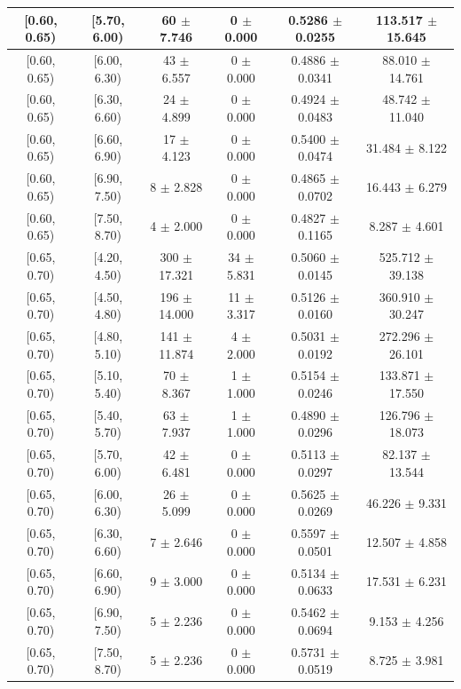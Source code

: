 \begin{longtable}{|c|c|c|c|c|c|}
\hline
[0.60, 0.65) & [5.70, 6.00) & 60 $\pm$ 7.746 & 0 $\pm$ 0.000 & 0.5286 $\pm$ 0.0255 & 113.517 $\pm$ 15.645 \\ 
\hline
[0.60, 0.65) & [6.00, 6.30) & 43 $\pm$ 6.557 & 0 $\pm$ 0.000 & 0.4886 $\pm$ 0.0341 & 88.010 $\pm$ 14.761 \\ 
\hline
[0.60, 0.65) & [6.30, 6.60) & 24 $\pm$ 4.899 & 0 $\pm$ 0.000 & 0.4924 $\pm$ 0.0483 & 48.742 $\pm$ 11.040 \\ 
\hline
[0.60, 0.65) & [6.60, 6.90) & 17 $\pm$ 4.123 & 0 $\pm$ 0.000 & 0.5400 $\pm$ 0.0474 & 31.484 $\pm$ 8.122 \\ 
\hline
[0.60, 0.65) & [6.90, 7.50) & 8 $\pm$ 2.828 & 0 $\pm$ 0.000 & 0.4865 $\pm$ 0.0702 & 16.443 $\pm$ 6.279 \\ 
\hline
[0.60, 0.65) & [7.50, 8.70) & 4 $\pm$ 2.000 & 0 $\pm$ 0.000 & 0.4827 $\pm$ 0.1165 & 8.287 $\pm$ 4.601 \\ 
\hline
[0.65, 0.70) & [4.20, 4.50) & 300 $\pm$ 17.321 & 34 $\pm$ 5.831 & 0.5060 $\pm$ 0.0145 & 525.712 $\pm$ 39.138 \\ 
\hline
[0.65, 0.70) & [4.50, 4.80) & 196 $\pm$ 14.000 & 11 $\pm$ 3.317 & 0.5126 $\pm$ 0.0160 & 360.910 $\pm$ 30.247 \\ 
\hline
[0.65, 0.70) & [4.80, 5.10) & 141 $\pm$ 11.874 & 4 $\pm$ 2.000 & 0.5031 $\pm$ 0.0192 & 272.296 $\pm$ 26.101 \\ 
\hline
[0.65, 0.70) & [5.10, 5.40) & 70 $\pm$ 8.367 & 1 $\pm$ 1.000 & 0.5154 $\pm$ 0.0246 & 133.871 $\pm$ 17.550 \\ 
\hline
[0.65, 0.70) & [5.40, 5.70) & 63 $\pm$ 7.937 & 1 $\pm$ 1.000 & 0.4890 $\pm$ 0.0296 & 126.796 $\pm$ 18.073 \\ 
\hline
[0.65, 0.70) & [5.70, 6.00) & 42 $\pm$ 6.481 & 0 $\pm$ 0.000 & 0.5113 $\pm$ 0.0297 & 82.137 $\pm$ 13.544 \\ 
\hline
[0.65, 0.70) & [6.00, 6.30) & 26 $\pm$ 5.099 & 0 $\pm$ 0.000 & 0.5625 $\pm$ 0.0269 & 46.226 $\pm$ 9.331 \\ 
\hline
[0.65, 0.70) & [6.30, 6.60) & 7 $\pm$ 2.646 & 0 $\pm$ 0.000 & 0.5597 $\pm$ 0.0501 & 12.507 $\pm$ 4.858 \\ 
\hline
[0.65, 0.70) & [6.60, 6.90) & 9 $\pm$ 3.000 & 0 $\pm$ 0.000 & 0.5134 $\pm$ 0.0633 & 17.531 $\pm$ 6.231 \\ 
\hline
[0.65, 0.70) & [6.90, 7.50) & 5 $\pm$ 2.236 & 0 $\pm$ 0.000 & 0.5462 $\pm$ 0.0694 & 9.153 $\pm$ 4.256 \\ 
\hline
[0.65, 0.70) & [7.50, 8.70) & 5 $\pm$ 2.236 & 0 $\pm$ 0.000 & 0.5731 $\pm$ 0.0519 & 8.725 $\pm$ 3.981 \\ 

\end{longtable}
